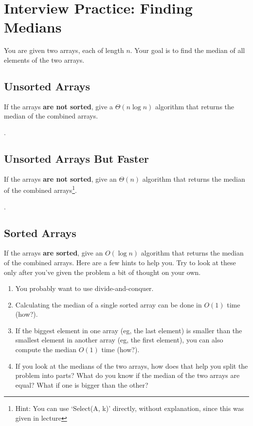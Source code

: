 \documentclass [12pt]{article}
\begin{document}
\pagebreak
\section{Interview Practice: Finding Medians }
You are given two arrays, each of length $n$. Your goal is to find the median of all elements of the two arrays.


\subsection{Unsorted Arrays }
If the arrays \textbf{are not sorted}, give a $\Theta(n \log n)$ algorithm that returns the median of the combined arrays.

.


\subsection{Unsorted Arrays But Faster } 

If the arrays \textbf{are not sorted}, give an $\Theta(n)$ algorithm that returns the median of the combined arrays\footnote{Hint: You can use `Select(A, k)' directly, without explanation, since this was given in lecture}.

.


\subsection{Sorted Arrays }

If the arrays \textbf{are sorted}, give an $O(\log n)$ algorithm that returns the median of the combined arrays. Here are a few hints to help you. Try to look at these only after you've given the problem a bit of thought on your own.

\begin{enumerate}[label=Hint \arabic*]
    \item You probably want to use divide-and-conquer.
    \item Calculating the median of a single sorted array can be done in $O(1)$ time (how?).
    \item If the biggest element in one array (eg, the last element) is smaller than the smallest element in another array (eg, the first element), you can also compute the median $O(1)$ time (how?).
    \item If you look at the medians of the two arrays, how does that help you split the problem into parts? What do you know if the median of the two arrays are equal? What if one is bigger than the other?
\end{enumerate}
\end{document}
